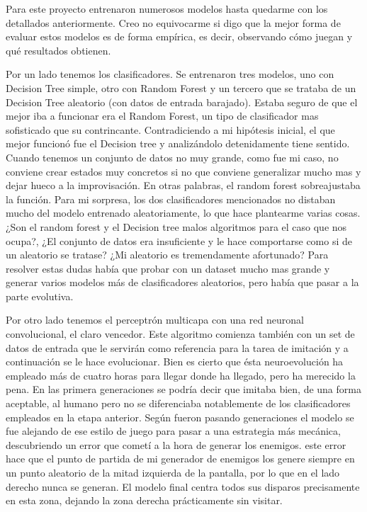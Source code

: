 
Para este proyecto entrenaron numerosos modelos hasta quedarme con los detallados anteriormente. Creo no equivocarme si digo que la mejor forma de evaluar estos modelos es de forma empírica, es decir, observando cómo juegan y qué resultados obtienen.

Por un lado tenemos los clasificadores. Se entrenaron tres modelos, uno con Decision Tree simple, otro con Random Forest y un tercero que se trataba de un Decision Tree aleatorio (con datos de entrada barajado). Estaba seguro de que el mejor iba a funcionar era el Random Forest, un tipo de clasificador mas sofisticado que su contrincante. Contradiciendo a mi hipótesis inicial, el que mejor funcionó fue el Decision tree y analizándolo detenidamente tiene sentido. Cuando tenemos un conjunto de datos no muy grande, como fue mi caso, no conviene crear estados muy concretos si no que conviene generalizar mucho mas y dejar hueco a la improvisación. En otras palabras, el random forest sobreajustaba la función. Para mi sorpresa, los dos clasificadores mencionados no distaban mucho del modelo entrenado aleatoriamente, lo que hace plantearme varias cosas. ¿Son el random forest y el Decision tree malos algoritmos para el caso que nos ocupa?, ¿El conjunto de datos era insuficiente y le hace comportarse como si de un aleatorio se tratase? ¿Mi aleatorio es tremendamente afortunado? Para resolver estas dudas había que probar con un dataset mucho mas grande y generar varios modelos más de clasificadores aleatorios, pero había que pasar a la parte evolutiva.


Por otro lado tenemos el perceptrón multicapa con una red neuronal convolucional, el claro vencedor. Este algoritmo comienza también con un set de datos de entrada que le servirán como referencia para la tarea de imitación y a continuación se le hace evolucionar. Bien es cierto que ésta neuroevolución ha empleado más de cuatro horas para llegar donde ha llegado, pero ha merecido la pena. En las primera generaciones se podría decir que imitaba bien, de una forma aceptable, al humano pero no se diferenciaba notablemente de los clasificadores empleados en la etapa anterior. Según fueron pasando generaciones el modelo se fue alejando de ese estilo de juego para pasar a una estrategia más mecánica, descubriendo un error que cometí a la hora de generar los enemigos. este error hace que el punto de partida de mi generador de enemigos los genere siempre en un punto aleatorio de la mitad izquierda de la pantalla, por lo que en el lado derecho nunca se generan. El modelo final centra todos sus disparos precisamente en esta zona, dejando la zona derecha prácticamente sin visitar. 

